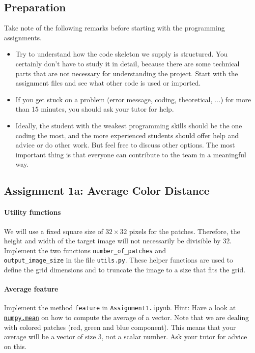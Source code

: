 \documentclass[a4paper]{article}
\begin{document}
	\subsection{Preparation}
		Take note of the following remarks before starting with the programming assignments.
		\begin{itemize}
			\item Try to understand how the code skeleton we supply is structured.
			You certainly don't have to study it in detail, because there are some technical parts that are not necessary for understanding the project.
			Start with the assignment files and see what other code is used or imported.
			
			\item If you get stuck on a problem (error message, coding, theoretical, ...) for more than 15 minutes, you should ask your tutor for help.
			
			\item Ideally, the student with the weakest programming skills should be the one coding the most, and the more experienced students should offer help and advice or do other work. 
			But feel free to discuss other options. 
			The most important thing is that everyone can contribute to the team in a meaningful way.
		\end{itemize}

	\subsection{Assignment 1a: Average Color Distance}
		\paragraph{Utility functions} 
		We will use a fixed square size of $32 \times 32$ pixels for the patches.
		Therefore, the height and width of the target image will not necessarily be divisible by 32.
		Implement the two functions \verb|number_of_patches| and \\ 
		\verb|output_image_size| in the file \verb|utils.py|.
		These helper functions are used to define the grid dimensions and to truncate the image to a size that fits the grid.
		
		\paragraph{Average feature}
		Implement the method \verb|feature| in \verb|Assignment1.ipynb|. 
		Hint: Have a look at 
		\href{https://docs.scipy.org/doc/numpy/reference/generated/numpy.mean.html}{\texttt{numpy.mean}} on how to compute the average of a vector.
		Note that we are dealing with colored patches (red, green and blue component). 
		This means that your average will be a vector of size 3, not a scalar number.
		Ask your tutor for advice on this.
		
\end{document}
